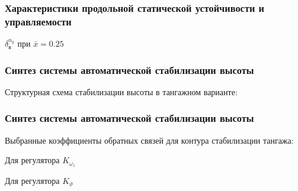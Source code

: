 \documentclass{beamer}
\begin{document}
\begin{frame}[t]
    \frametitle{Характеристики продольной статической устойчивости и управляемости}
    \begin{center}
        $\delta_{в}^{n_y}$ при $\bar{x} = 0.25$

        \resizebox{0.70\textwidth}{!}{}
    \end{center}
\end{frame}

\begin{frame}
    \frametitle{Синтез системы автоматической стабилизации высоты}
\begin{center}
    Структурная схема стабилизации высоты в тангажном варианте:
    \vspace{14pt}

    \resizebox{1.35\textwidth}{!}{}
\end{center}

\end{frame}
\begin{frame}[t]
    \frametitle{Синтез системы автоматической стабилизации высоты}
    \begin{center}
        Выбранные коэффициенты обратных связей для контура стабилизации тангажа:
        \vspace{14pt}

        \begin{minipage}{0.45\textwidth}
            \begin{center}
                Для регулятора $K_{\omega_z}$\\
                \resizebox{\textwidth}{!}{}
            \end{center}
        \end{minipage}
        \hfill
        \begin{minipage}{0.45\textwidth}
            \begin{center}
                Для регулятора $K_{\vartheta}$\\
                \resizebox{\textwidth}{!}{}
            \end{center}
        \end{minipage}
    \end{center}
\end{frame}
\end{document}
